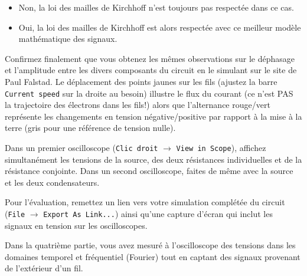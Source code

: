 \documentclass[canadien,12pt,oneside,letterpaper]{article}
\begin{document}
\begin{gradescope}
\begin{gradescope}
\begin{itemize}[label=$\blacktriangleright$]
            \item Non, la loi des mailles de Kirchhoff n'est toujours pas respectée dans ce cas.
            \item Oui, la loi des mailles de Kirchhoff est alors respectée avec ce meilleur modèle mathématique des signaux.
        \end{itemize}
        \item Confirmez finalement que vous obtenez les mêmes observations sur le déphasage et l'amplitude entre les divers composants du circuit en le simulant sur le site de Paul Falstad. Le déplacement des points jaunes sur les fils (ajustez la barre \texttt{Current speed} sur la droite au besoin) illustre le flux du courant (ce n'est PAS la trajectoire des électrons dans les fils!) alors que l'alternance rouge/vert représente les changements en tension négative/positive par rapport à la mise à la terre (gris pour une référence de tension nulle).\par
        Dans un premier oscilloscope (\texttt{Clic droit} $\rightarrow$ \texttt{View in Scope}), affichez simultanément les tensions de la source, des deux résistances individuelles et de la résistance conjointe. Dans un second oscilloscope, faites de même avec la source et les deux condensateurs.\par
        Pour l'évaluation, remettez un lien vers votre simulation complétée du circuit (\texttt{File} $\rightarrow$ \texttt{Export As Link...}) ainsi qu'une capture d'écran qui inclut les signaux en tension sur les oscilloscopes.\par
        \noindent{}
    \end{gradescope}
    \vspace{1ex}
    \item Dans la quatrième partie, vous avez mesuré à l'oscilloscope des tensions dans les domaines temporel et fréquentiel (Fourier) tout en captant des signaux provenant de l'extérieur d'un fil.

\end{gradescope}
\end{document}
